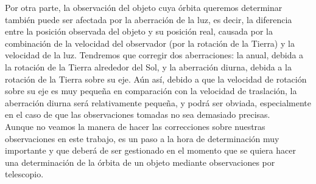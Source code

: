 \documentclass[11pt]{book}
\begin{document}
Por otra parte, la observación del objeto cuya órbita queremos determinar también puede ser afectada por la aberración de la luz, es decir, la diferencia entre la posición observada del objeto y su posición real, causada por la combinación de la velocidad del observador (por la rotación de la Tierra) y la velocidad de la luz. Tendremos que corregir dos aberraciones: la anual, debida a la rotación de la Tierra alrededor del Sol, y la aberración diurna, debida a la rotación de la Tierra sobre su eje. Aún así, debido a que la velocidad de rotación sobre su eje es muy pequeña en comparación con la velocidad de traslación, la aberración diurna será relativamente pequeña, y podrá ser obviada, especialmente en el caso de que las observaciones tomadas no sea demasiado precisas.\\

Aunque no veamos la manera de hacer las correcciones sobre nuestras observaciones en este trabajo, es un paso a la hora de determinación muy importante y que deberá de ser gestionado en el momento que se quiera hacer una determinación de la órbita de un objeto mediante observaciones por telescopio.\\
\end{document}
